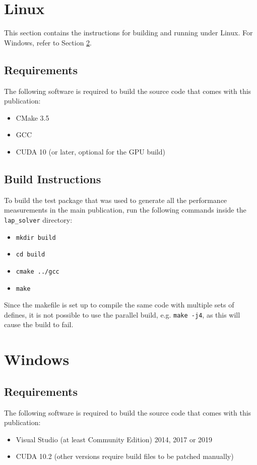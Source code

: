\documentclass[format=acmsmall,review=false, screen=true]{acmart}
\begin{document}
\section{Linux}
\label{sec:linux}
This section contains the instructions for building and running under Linux. For Windows, refer to Section \ref{sec:windows}.

\subsection{Requirements}
The following software is required to build the source code that comes with this publication:
\begin{itemize}
\item CMake 3.5
\item GCC
\item CUDA 10 (or later, optional for the GPU build)
\end{itemize}

\subsection{Build Instructions}
To build the test package that was used to generate all the performance measurements in the main publication, run the following commands inside the \texttt{lap\_solver} directory:
\begin{itemize}
\item \small{\texttt{mkdir build}}
\item \small{\texttt{cd build}}
\item \small{\texttt{cmake ../gcc}}
\item \small{\texttt{make}}
\end{itemize}
Since the makefile is set up to compile the same code with multiple sets of defines, it is not possible to use the parallel build, e.g. \texttt{make -j4}, as this will cause the build to fail.

\section{Windows}
\label{sec:windows}

\subsection{Requirements}
The following software is required to build the source code that comes with this publication:
\begin{itemize}
\item Visual Studio (at least Community Edition) 2014, 2017 or 2019
\item CUDA 10.2 (other versions require build files to be patched manually)
\end{itemize}
\end{document}
